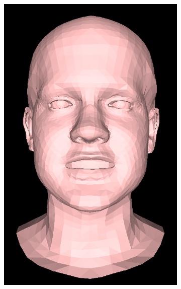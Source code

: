 \begin{figure}[h]
\begin{subfigure}[b]{0.24\textwidth}
    \end{subfigure}
    \begin{subfigure}[b]{0.24\textwidth}
        \includegraphics[width=\textwidth]{figures/blendshape_interp/3/00002.png}
    \end{subfigure}
    \begin{subfigure}[b]{0.24\textwidth}

\end{subfigure}
\end{figure}
